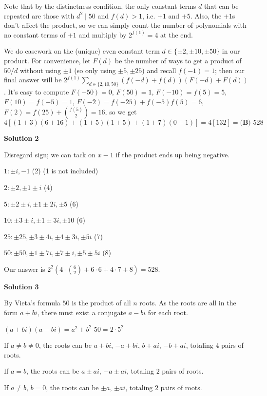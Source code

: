 \begin{enumerate}
 Note that by the distinctness condition, the only constant terms $d$ that can be repeated are those with $d^2\mid 50$ and $f(d)>1$, i.e. $+1$ and $+5$. Also, the $+1$s don't affect the product, so we can simply count the number of polynomials with no constant terms of $+1$ and multiply by $2^{f(1)} = 4$ at the end.

 We do casework on the (unique) even constant term $d\in\{\pm2,\pm10,\pm50\}$ in our product. For convenience, let $F(d)$ be the number of ways to get a product of $50/d$ without using $\pm 1$ (so only using $\pm5,\pm25$) and recall $f(-1) = 1$; then our final answer will be $2^{f(1)}\sum_{d\in\{2,10,50\}}(f(-d)+f(d))(F(-d)+F(d))$. It's easy to compute $F(-50)=0$, $F(50)=1$, $F(-10)=f(5)=5$, $F(10)=f(-5)=1$, $F(-2)=f(-25)+f(-5)f(5)=6$, $F(2)=f(25)+\binom{f(5)}{2}=16$, so we get
 \[4 [ (1+3)(6+16) + (1+5)(1+5) + (1+7)(0+1) ] = 4[132] = \boxed{\textbf{(B) }528}\]




\textbf{Solution 2}

Disregard sign; we can tack on $x-1$ if the product ends up being negative.

 $1: \pm i,-1$ (2) (1 is not included)

 $2: \pm 2, \pm 1\pm i$ (4)

 $5: \pm 2\pm i, \pm 1\pm 2i, \pm 5$ (6)

 $10: \pm 3\pm i, \pm 1\pm 3i, \pm 10$ (6)

 $25: \pm 25, \pm 3\pm 4i, \pm 4\pm 3i, \pm 5i$ (7)

 $50: \pm 50, \pm 1\pm 7i, \pm7\pm i, \pm 5\pm 5i$ (8)

 Our answer is $2^2\left(4\cdot\binom{6}{2}+6\cdot 6+4\cdot 7+8\right)=\boxed{528.}$




\textbf{Solution 3}

By Vieta's formula $50$ is the product of all $n$ roots. As the roots are all in the form $a + bi$, there must exist a conjugate $a-bi$ for each root.

 $(a+bi)(a-bi) = a^2 + b^2$
$50 = 2 \cdot 5^2$

 If $a \neq b \neq 0$, the roots can be $a \pm bi$, $-a \pm bi$, $b \pm ai$, $-b \pm ai$, totaling $4$ pairs of roots.

 If $a = b$, the roots can be $a \pm ai$, $-a \pm ai$, totaling $2$ pairs of roots.

 If $a \neq b$, $b = 0$, the roots can be $\pm a$, $\pm ai$, totaling $2$ pairs of roots.


\end{enumerate}
